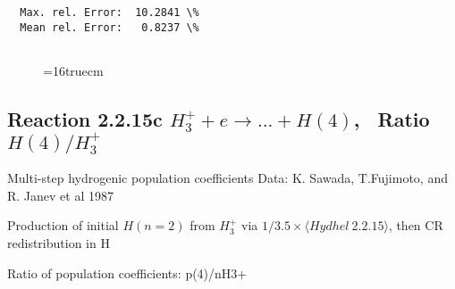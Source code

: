\documentclass[12pt,dvipdfmx]{article}
\begin{document}
\begin{small}
\begin{verbatim}
  Max. rel. Error:  10.2841 \%
  Mean rel. Error:   0.8237 \%


\end{verbatim}\end{small}
\begin{figure} \label{2.2.15b}
\epsfxsize=16truecm
\end{figure}
\newpage


\subsection{
Reaction 2.2.15c $ H_3^+ + e \rightarrow ...+ H(4) $, \   Ratio $H(4)/H_3^+  $
}

 Multi-step hydrogenic population coefficients
 Data: K. Sawada, T.Fujimoto, \cite{kn:Sawada} and R. Janev et al 1987

 Production of initial $H(n=2)$ from $H_3^+$ via $1/3.5 \times \langle Hydhel~ 2.2.15\rangle$,
 then CR redistribution in H

 Ratio of population coefficients: p(4)/nH3+
\end{document}
